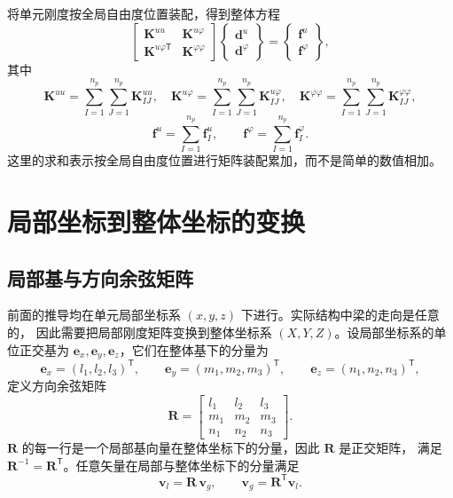 \documentclass[UTF8,a4paper,11pt]{ctexart}
\newcommand{\bR}{\mathbf{R}}
\newcommand{\bK}{\mathbf{K}}
\newcommand{\bd}{\mathbf{d}}
\newcommand{\bff}{\mathbf{f}}
\begin{document}
将单元刚度按全局自由度位置装配，得到整体方程
\begin{equation}\label{eq:global}
\begin{bmatrix}
\bK^{uu} & \bK^{u\varphi}\\
\bK^{u\varphi\mathsf T} & \bK^{\varphi\varphi}
\end{bmatrix}
\begin{Bmatrix}
\bd^u\\ \bd^\varphi
\end{Bmatrix}
=
\begin{Bmatrix}
\bff^u\\ \bff^\varphi
\end{Bmatrix},
\end{equation}
其中
\begin{equation}
\bK^{uu}=\sum_{I=1}^{n_p}\sum_{J=1}^{n_p}\bK_{IJ}^{uu},\quad
\bK^{u\varphi}=\sum_{I=1}^{n_p}\sum_{J=1}^{n_p}\bK_{IJ}^{u\varphi},\quad
\bK^{\varphi\varphi}=\sum_{I=1}^{n_p}\sum_{J=1}^{n_p}\bK_{IJ}^{\varphi\varphi},
\end{equation}
\begin{equation}
\bff^u=\sum_{I=1}^{n_p}\bff_I^u,\qquad
\bff^\varphi=\sum_{I=1}^{n_p}\bff_I^\varphi.
\end{equation}
这里的求和表示按全局自由度位置进行矩阵装配累加，而不是简单的数值相加。

\section{局部坐标到整体坐标的变换}\label{sec:coord}

\subsection{局部基与方向余弦矩阵}

前面的推导均在单元局部坐标系 $(x,y,z)$ 下进行。实际结构中梁的走向是任意的，
因此需要把局部刚度矩阵变换到整体坐标系 $(X,Y,Z)$。设局部坐标系的单位正交基为
$\mathbf{e}_x,\mathbf{e}_y,\mathbf{e}_z$，它们在整体基下的分量为
\begin{equation}
\mathbf{e}_x=(l_1,l_2,l_3)^{\mathsf T},\qquad
\mathbf{e}_y=(m_1,m_2,m_3)^{\mathsf T},\qquad
\mathbf{e}_z=(n_1,n_2,n_3)^{\mathsf T},
\end{equation}
定义方向余弦矩阵
\begin{equation}\label{eq:R}
\bR=\begin{bmatrix}
l_1&l_2&l_3\\ m_1&m_2&m_3\\ n_1&n_2&n_3
\end{bmatrix}.
\end{equation}
$\bR$ 的每一行是一个局部基向量在整体坐标下的分量，因此 $\bR$ 是正交矩阵，
满足 $\bR^{-1}=\bR^{\mathsf T}$。任意矢量在局部与整体坐标下的分量满足
\begin{equation}\label{eq:vec-transform}
\mathbf{v}_l=\bR\,\mathbf{v}_g,\qquad
\mathbf{v}_g=\bR^{\mathsf T}\mathbf{v}_l.
\end{equation}
\end{document}

